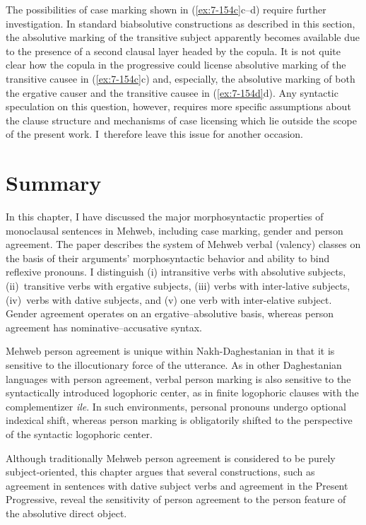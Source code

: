 ﻿\documentclass[output=paper]{langsci/langscibook}
\begin{document}
The possibilities of case marking shown in (\ref{ex:7-154c}c–d) require further
investigation. In standard biabsolutive constructions as described in
this section, the absolutive marking of the transitive subject
apparently becomes available due to the presence of a second clausal
layer headed by the copula. It is not quite clear how the copula in the
progressive could license absolutive marking of the transitive
causee in (\ref{ex:7-154c}c) and, especially, the absolutive marking of both the
ergative causer and the transitive causee in (\ref{ex:7-154d}d). Any syntactic
speculation on this question, however, requires more specific
assumptions about the clause structure and mechanisms of case licensing
which lie outside the scope of the present work. I~therefore
leave this issue for another occasion.

\section{Summary}\label{Summary}

In this chapter, I have discussed the major morphosyntactic properties of
monoclausal sentences in Mehweb, including case marking, gender and
person agreement. The paper describes the system of Mehweb verbal
(valency) classes on the basis of their arguments' morphosyntactic
behavior and ability to bind reflexive pronouns. I distinguish (i)
intransitive verbs with absolutive subjects, (ii)~transitive verbs with
ergative subjects, (iii) verbs with inter-lative subjects, (iv)~verbs
with dative subjects, and (v) one verb with inter-elative subject.
Gender agreement operates on an ergative–absolutive basis, whereas
person agreement has nominative–accusative syntax.

Mehweb person agreement is unique  within Nakh-Daghestanian in that it is sensitive to the
illocutionary force of the utterance. As in other Daghestanian
languages with person agreement, verbal person marking is also sensitive
to the syntactically introduced logophoric center, as in finite
logophoric clauses with the complementizer \emph{ile}. In such
environments, personal pronouns undergo optional indexical shift,
whereas person marking is obligatorily shifted to the perspective of the
syntactic logophoric center.

Although traditionally Mehweb person agreement is considered to be
purely subject-oriented, this chapter argues that several constructions,
such as agreement in sentences with dative subject verbs and agreement
in the Present Progressive, reveal the sensitivity of person agreement to
the person feature of the absolutive direct object.
\end{document}

